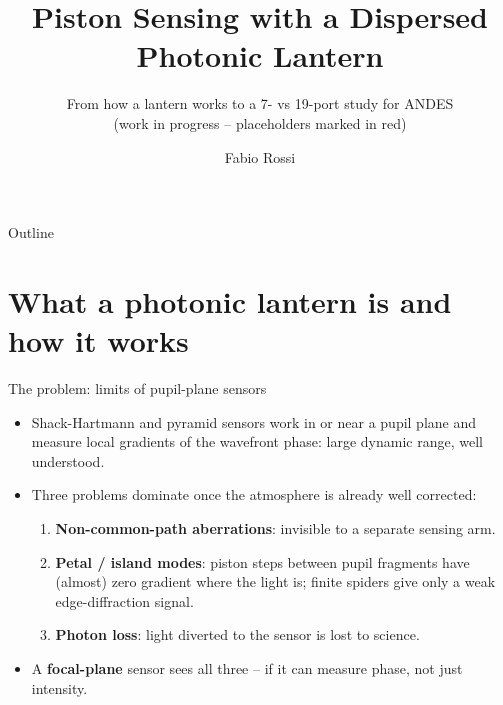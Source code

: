 \documentclass[aspectratio=169,10pt]{beamer}
\title[Piston sensing with a dispersed photonic lantern]{Piston Sensing with a Dispersed Photonic Lantern}
\subtitle{From how a lantern works to a 7- vs 19-port study for ANDES \\ \footnotesize(work in progress -- placeholders marked in red)}
\author{Fabio Rossi}
\institute{INAF -- Osservatorio Astrofisico di Arcetri}
\date{\tbd}
\begin{document}
\begin{frame}
\titlepage
\end{frame}

\begin{frame}{Outline}
\tableofcontents[hideallsubsections]
\end{frame}

\section{What a photonic lantern is and how it works}
\begin{frame}{The problem: limits of pupil-plane sensors}
\begin{itemize}
    \item Shack-Hartmann and pyramid sensors work in or near a pupil plane and measure local
          gradients of the wavefront phase: large dynamic range, well understood.
    \item Three problems dominate once the atmosphere is already well corrected:
    \begin{enumerate}
        \item \textbf{Non-common-path aberrations}: invisible to a separate sensing arm.
        \item \textbf{Petal / island modes}: piston steps between pupil fragments have (almost)
              zero gradient where the light is; finite spiders give only a weak edge-diffraction signal.
        \item \textbf{Photon loss}: light diverted to the sensor is lost to science.
    \end{enumerate}
    \item A \textbf{focal-plane} sensor sees all three -- if it can measure phase, not just intensity.
\end{itemize}
\end{frame}
\end{document}
